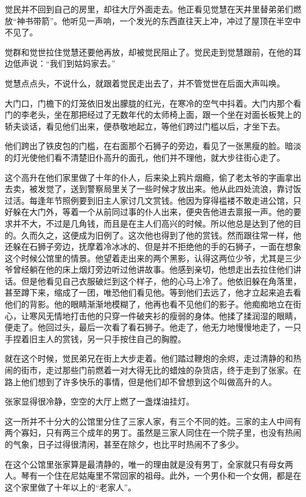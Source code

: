 \par 觉民并不回到自己的房里，却往大厅外面走去。他正看见觉慧在天井里替弟弟们燃放“神书带箭”。他听见一声响，一个发光的东西直往天上冲，冲过了屋顶在半空中不见了。
\par 觉群和觉世拉住觉慧还要他再放，却被觉民阻止了。觉民走到觉慧跟前，在他的耳边低声说：“我们到姑妈家去。”
\par 觉慧点点头，不说什么，就跟着觉民走出去了，并不管觉世在后面大声叫唤。
\par 大门口，门檐下的灯笼依旧发出朦胧的红光，在寒冷的空气中抖着。大门内那个看门的李老头，坐在那把经过了无数年代的太师椅上面，跟一个坐在对面长板凳上的轿夫谈话，看见他们出来，便恭敬地起立，等他们跨过门槛以后，才坐下去。
\par 他们跨出了铁皮包的门槛，在右面那个石狮子的旁边，看见了一张黑瘦的脸。暗淡的灯光使他们看不清楚旧仆高升的面孔，他们并不理他，就大步往街心走了。
\par 这个高升在他们家里做了十年的仆人，后来染上鸦片烟瘾，偷了老太爷的字画拿出去卖，被发觉了，送到警察局里关了一些时候才放出来。他从此四处流浪，靠讨饭过活。每逢年节照例要到旧主人家讨几文赏钱。他因为穿得褴褛不敢走进公馆，只好躲在大门外，等着一个从前同过事的仆人出来，便央告他进去禀报一声。他的要求并不大，不过是几角钱，而且是在主人们高兴的时候。所以他总是达到了他的目的。久而久之，这便成为旧例了。这次他也得到了他的赏钱。然而跟往常一样，他还躲在石狮子旁边，抚摩着冷冰冰的、但是并不拒绝他的手的石狮子，一面在想象这个时候公馆里的情景。他望着走出来的两个黑影，认得这两位少爷，尤其是三少爷曾经躺在他的床上烟灯旁边听过他讲故事。他感到亲切，他想走出去拉住他们讲话。但是他看见自己衣服破烂到这个样子，他的心马上冷了。他依旧躲在角落里，甚至蹲下来，缩成了一团，唯恐他们看见他。等到他们去远了，他才立起来追去看他们的背影。他的眼睛渐渐地模糊了，他再也看不见他们的影子。他痴痴地立在街心，让寒风无情地打击他的只穿一件破夹衫的瘦弱的身体。他揉了揉润湿的眼睛，便走了。他回过头，最后一次看了看石狮子。他走了，他无力地慢慢地走了，一只手捏着旧主人的赏钱，另一只手按住自己的胸膛。
\par 就在这个时候，觉民弟兄在街上大步走着。他们踏过鞭炮的余烬，走过清静的和热闹的街市，走过那些门前燃着一对大得无比的蜡烛的杂货店，终于走到了张家。在路上他们想到了许多快乐的事情，但是他们却不曾想到这个叫做高升的人。
\par 张家显得很冷静，空空的大厅上燃了一盏煤油挂灯。
\par 这一所并不十分大的公馆里分住了三家人家，有三个不同的姓。三家的主人中间有两个寡妇，只有两三个成年的男丁。虽然是三家人同住在一个院子里，也没有热闹的气象，日子过得很清闲，甚至在除夕，也比平时热闹不了多少。
\par 在这个公馆里张家算是最清静的，唯一的理由就是没有男丁，全家就只有母女两人。琴有一个住在尼姑庵里不常回家的祖母。此外，一个男仆和一个女佣，都是在这个家里做了十年以上的“老家人”。
